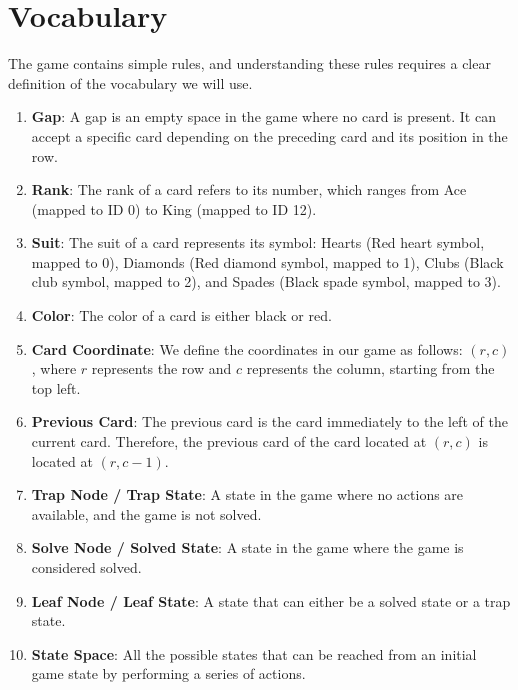 \section{Vocabulary}
The game contains simple rules, and understanding these rules requires a clear definition of the vocabulary we will use.
\begin{enumerate}
    \item \textbf{Gap}: A gap is an empty space in the game where no card is present. It can accept a specific card depending on the preceding card and its position in the row.
    \item \textbf{Rank}: The rank of a card refers to its number, which ranges from Ace (mapped to ID 0) to King (mapped to ID 12).
    \item \textbf{Suit}: The suit of a card represents its symbol: Hearts (Red heart symbol, mapped to 0), Diamonds (Red diamond symbol, mapped to 1), Clubs (Black club symbol, mapped to 2), and Spades (Black spade symbol, mapped to 3).
    \item \textbf{Color}: The color of a card is either black or red.
    \item \textbf{Card Coordinate}: We define the coordinates in our game as follows: $(r, c)$, where $r$ represents the row and $c$ represents the column, starting from the top left.
    \item \textbf{Previous Card}: The previous card is the card immediately to the left of the current card. Therefore, the previous card of the card located at $(r, c)$ is located at $(r, c-1)$.
    \item \textbf{Trap Node / Trap State}: A state in the game where no actions are available, and the game is not solved.
    \item \textbf{Solve Node / Solved State}: A state in the game where the game is considered solved.
    \item \textbf{Leaf Node / Leaf State}: A state that can either be a solved state or a trap state.
    \item \textbf{State Space}: All the possible states that can be reached from an initial game state by performing a series of actions.
\end{enumerate}


